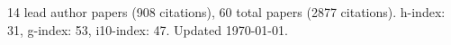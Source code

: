 14 lead author papers (908 citations),
60 total papers (2877 citations).\newline
h-index: 31, g-index: 53, i10-index: 47. Updated \today.
